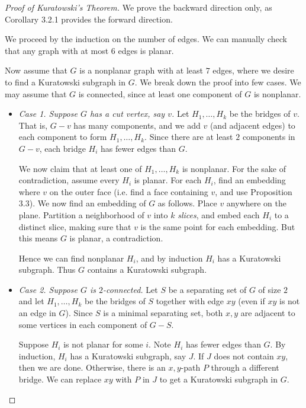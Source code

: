 \documentclass[co342]{subfiles}
\begin{document}
    \begin{proof}[Proof of Kuratowski's Theorem]
        We prove the backward direction only, as Corollary 3.2.1 provides the forward direction. 

        We proceed by the induction on the number of edges. We can manually check that any graph with at most $6$ edges is planar.

        Now assume that $G$ is a nonplanar graph with at least $7$ edges, where we desire to find a Kuratowski subgraph in $G$. We break down the proof into few cases. We may assume that $G$ is connected, since at least one component of $G$ is nonplanar.
        \begin{itemize}
            \item \textit{Case 1. Suppose $G$ has a cut vertex, say $v$.} Let $H_1,\ldots,H_k$ be the bridges of $v$. That is, $G-v$ has many components, and we add $v$ (and adjacent edges) to each component to form $H_1,\ldots,H_k$. Since there are at least $2$ components in $G-v$, each bridge $H_i$ has fewer edges than $G$. 

                We now claim that at least one of $H_1,\ldots,H_k$ is nonplanar. For the sake of contradiction, assume every $H_i$ is planar. For each $H_i$, find an embedding where $v$ on the outer face (i.e. find a face containing $v$, and use Proposition 3.3). We now find an embedding of $G$ as follows. Place $v$ anywhere on the plane. Partition a neighborhood of $v$ into $k$ \textit{slices}, and embed each $H_i$ to a distinct slice, making sure that $v$ is the same point for each embedding. But this means $G$ is planar, a contradiction.

                Hence we can find nonplanar $H_i$, and by induction $H_i$ has a Kuratowski subgraph. Thus $G$ contains a Kuratowski subgraph.

            \item \textit{Case 2. Suppose $G$ is $2$-connected.} Let $S$ be a separating set of $G$ of size $2$ and let $H_1,\ldots,H_k$ be the bridges of $S$ together with edge $xy$ (even if $xy$ is not an edge in $G$). Since $S$ is a minimal separating set, both $x,y$ are adjacent to some vertices in each component of $G-S$.

                Suppose $H_i$ is not planar for some $i$. Note $H_i$ has fewer edges than $G$. By induction, $H_i$ has a Kuratowski subgraph, say $J$. If $J$ does not contain $xy$, then we are done. Otherwise, there is an $x,y$-path $P$ through a different bridge. We can replace $xy$ with $P$ in $J$ to get a Kuratowski subgraph in $G$.


\end{itemize}
\end{proof}
\end{document}
